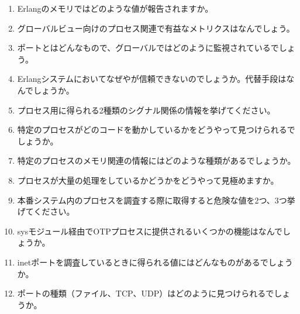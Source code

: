 \begin{enumerate}
  \item Erlangのメモリではどのような値が報告されますか。
  \item グローバルビュー向けのプロセス関連で有益なメトリクスはなんでしょう。
  \item ポートとはどんなもので、グローバルではどのように監視されているでしょう。
  \item Erlangシステムにおいてなぜやが信頼できないのでしょうか。代替手段はなんでしょうか。
  \item プロセス用に得られる2種類のシグナル関係の情報を挙げてください。
  \item 特定のプロセスがどのコードを動かしているかをどうやって見つけられるでしょうか。
  \item 特定のプロセスのメモリ関連の情報にはどのような種類があるでしょうか。 
  \item プロセスが大量の処理をしているかどうかをどうやって見極めますか。
  \item 本番システム内のプロセスを調査する際に取得すると危険な値を2つ、3つ挙げてください。
  \item sysモジュール経由でOTPプロセスに提供されるいくつかの機能はなんでしょうか。
  \item inetポートを調査しているときに得られる値にはどんなものがあるでしょうか。
  \item ポートの種類（ファイル、TCP、UDP）はどのように見つけられるでしょうか。
\end{enumerate}


